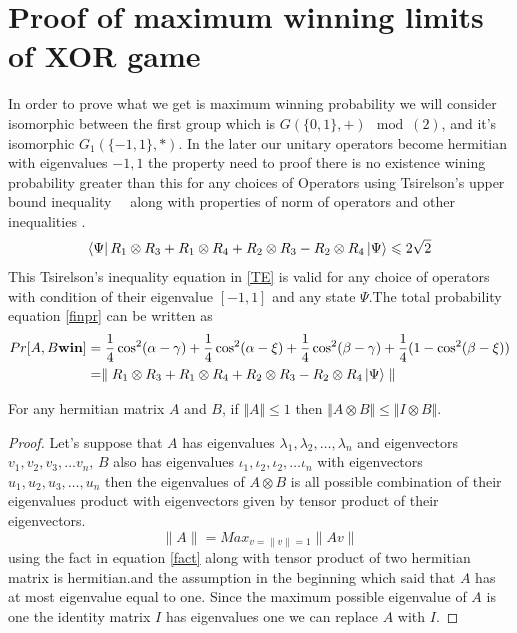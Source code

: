 \section*{Proof of maximum winning limits of XOR game}
In order to prove what we get is maximum winning  probability we will consider isomorphic between  the first group   which is $G(\{0,1\},+) \mod(2)$, and it's isomorphic  $ G_1(\{-1,1\},*)$. In the later our unitary operators  become hermitian with eigenvalues ${-1,1}$ the property need to proof there is  no existence wining probability greater than this for any choices of Operators using Tsirelson’s  upper bound inequality~\citep{Cirel'son1980}~ along with properties of norm of operators  and other inequalities .%
\begin{align}
\bra{\Psi}R_1\otimes R_3+ R_1\otimes R_4+R_2\otimes R_3 -R_2\otimes R_4\ket{\Psi}\leqslant 2\sqrt{2}\label{TE}
\end{align}
This Tsirelson’s inequality equation in  \ref{TE} is valid for any choice of operators with condition of their eigenvalue $\left[-1,1\right]$ and any state $\Psi$.The total probability equation \ref{finpr} can be written as
\begin{align}
Pr[A,B \textbf{win}]&=\frac{1}{4} \cos^2(\alpha-\gamma)+\frac{1}{4} \cos^2(\alpha-\xi)+\frac{1}{4} \cos^2(\beta-\gamma)+\frac{1}{4} (1-\cos^2(\beta-\xi))\nonumber\\
&=\parallel R_1\otimes R_3+ R_1\otimes R_4+R_2\otimes R_3 -R_2\otimes R_4\ket{\Psi}\parallel \label{TE2}
\end{align}
\begin{lemma}
\label{lem:tensor-norm}
For any hermitian matrix $A$ and $B$, if $\Vert A\Vert \leqslant 1$ then $\Vert A\otimes B \Vert \leqslant \Vert I\otimes B \Vert$.
\end{lemma}

\begin{proof}
Let's suppose that $A$ has eigenvalues $\lambda_1,\lambda_2,\dots ,\lambda_n$ and eigenvectors $v_1,v_2,v_3,\dots v_n$, $B$ also has eigenvalues $\iota_1,\iota_2,\iota_2,\dots \iota_n$ with eigenvectors $u_1,u_2,u_3, \dots ,u_n$ then the eigenvalues of $A\otimes B$ is all possible combination of their eigenvalues product with eigenvectors given by tensor product of their eigenvectors.
\begin{equation}
\parallel A \parallel=Max_{v=\parallel v\parallel=1}\parallel A v\parallel\label{fact}
\end{equation}
using the fact in equation \ref {fact} along with tensor product of two hermitian matrix is hermitian.and the   assumption in the  beginning which said that $A$ has at most eigenvalue equal to one. Since the maximum possible eigenvalue of $A$ is one the identity matrix $I$ has eigenvalues one we can replace $A$ with $I$.
\end{proof}

